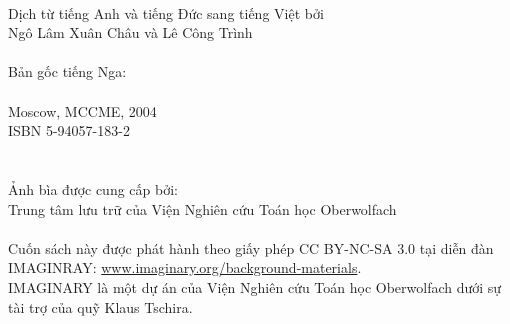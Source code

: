 \\
Dịch từ tiếng Anh và tiếng Đức sang tiếng Việt bởi \\
\null\quad Ngô Lâm Xuân Châu và Lê Công Trình \\
\\
Bản gốc tiếng Nga:\\
\null{}\\
\null\quad Moscow, MCCME, 2004\\
\null\quad ISBN 5-94057-183-2\\
\\
\\
Ảnh bìa được cung cấp bởi:\\ 
\null\quad Trung tâm lưu trữ của Viện Nghiên cứu Toán học Oberwolfach\\
\\
Cuốn sách này được phát hành theo giấy phép CC BY-NC-SA 3.0 tại diễn đàn IMAGINRAY: \href{http://www.imaginary.org/background-materials}{www.imaginary.org/background-materials}.\\
IMAGINARY là một dự án của Viện Nghiên cứu Toán học Oberwolfach dưới sự tài trợ của quỹ Klaus Tschira.

